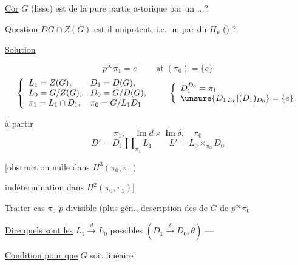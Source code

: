 \uline{Cor} $G$ (lisse) est   de la pure partie a-torique par un $\ldots$?

\uline{Question} $DG\cap Z(G)$ est-il  unipotent, i.e.
un  par du $H_p$ () ?

\uline{Solution}


\[
p^\infty\pi_1=e\qquad \operatorname{at}(\pi_0)=\{e\}
\]
\[
\left\{\begin{array}{ll}
L_1=Z(G),&D_1=D(G),\\
L_0=G/Z(G),&D_0=G/D(G),\\
\pi_1=L_1\cap D_1,&\pi_0=G/L_1D_1
\end{array}\right.
\qquad
\left\{\begin{array}{l}
D_1^{D_0}=\pi_1\\
\unsure{D_{1\,D_0}|(D_1)_{D_0}}=\{e\}
\end{array}\right.
\]

 à partir
\[
\pi_1,\quad \operatorname{Im}d\times\operatorname{Im}\delta,\quad \pi_0
\]
\[
D'=D_1\amalg_{\pi_1}L_1\qquad L'=L_0\times_{\pi_0}D_0
\]

[obstruction nulle dans $H^3(\pi_0,\pi_1)$

indétermination dans $H^2(\pi_0,\pi_1)$]

Traiter cas $\pi_0$ $p$-divisible (plus gén., description des
  de $G$  de $p^\infty\pi_0$

\uline{Dire quels sont les} $L_1\xrightarrow{d}L_0$ possibles
$(D_1\xrightarrow{\delta}D_0,\theta)$ ---

\uline{Condition pour que} $G$ soit linéaire
